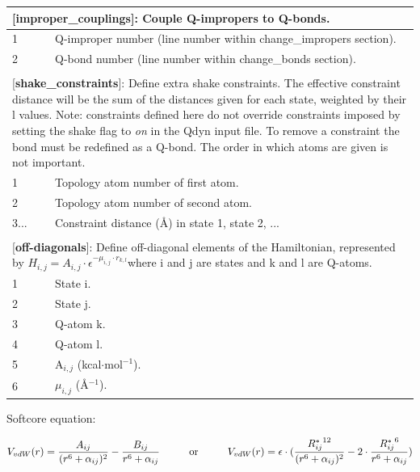 \documentclass[10pt,oneside,pdftex]{article}
\begin{document}
\begin{longtable}{|p{53pt}|p{181pt}|p{160pt}|}
\multicolumn{3}{p{394pt}}{[\textbf{improper\_couplings}]: Couple Q-impropers to Q-bonds.}\\
\hline 1 & \multicolumn{2}{p{341pt}|}{Q-improper number (line number within change\_impropers section).}\\
\hline 2 & \multicolumn{2}{p{341pt}|}{Q-bond number (line number within change\_bonds section).}\\
\hline
\multicolumn{3}{p{394pt}}{}\\

\multicolumn{3}{p{394pt}}{[\textbf{shake\_constraints}]: Define extra shake constraints. The effective constraint distance will be the sum of the distances given for each state, weighted by their l values. Note: constraints defined here do not override constraints imposed by setting the shake flag to \emph{on} in the Qdyn input file. To remove a constraint the bond must be redefined as a Q-bond. The order in which atoms are given is not important.}\\
\hline 1 & \multicolumn{2}{p{341pt}|}{Topology atom number of first atom.}\\
\hline 2 & \multicolumn{2}{p{341pt}|}{Topology atom number of second atom.}\\
\hline 3... & \multicolumn{2}{p{341pt}|}{Constraint distance ({\AA}) in state 1, state 2, ...}\\
\hline
\multicolumn{3}{p{394pt}}{}\\

\multicolumn{3}{p{394pt}}{[\textbf{off-diagonals}]: Define off-diagonal elements of the Hamiltonian, represented by $H_{i,j}=A_{i,j}\cdot \epsilon^{-\mu_{i,j}\cdot r_{k,l}}$where i and j are states and k and l are Q-atoms.}\\
\hline 1 & \multicolumn{2}{p{341pt}|}{State i.}\\
\hline 2 & \multicolumn{2}{p{341pt}|}{State j.}\\
\hline 3 & \multicolumn{2}{p{341pt}|}{Q-atom k.}\\
\hline 4 & \multicolumn{2}{p{341pt}|}{Q-atom l.}\\
\hline 5 & \multicolumn{2}{p{341pt}|}{A$_{i,j}$ (kcal$\cdot$mol$^{-1}$).}\\
\hline 6 & \multicolumn{2}{p{341pt}|}{$\mu_{i,j}$ ({\AA}$^{-1}$).}\\
\hline
\end{longtable}
\normalsize

Softcore equation:

\begin {equation}
\label{eq:softcore}
 V_{vdW}(r) = \frac{A_{ij}}{(r^6 + \alpha_{ij})^2} - \frac{B_{ij}}{r^6 +
 \alpha_{ij}}
 \text{\hspace{1cm}or\hspace{1cm}}
 V_{vdW}(r) = \epsilon\cdot(\frac{{R_{ij}^{*}}^{12}}{(r^6 + \alpha_{ij})^2} - 2\cdot\frac{{R_{ij}^{*}}^{6}}{r^6 + \alpha_{ij}})
\end{equation}
\end{document}
